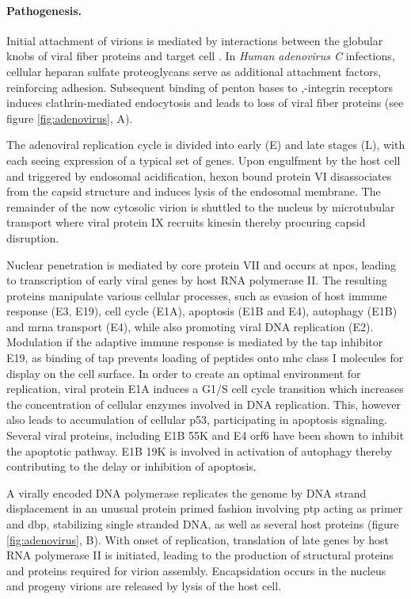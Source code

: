 \paragraph{Pathogenesis.}
Initial attachment of virions is mediated by interactions between the globular knobs of viral fiber proteins and target cell . In \textit{Human adenovirus C} infections, cellular heparan sulfate proteoglycans serve as additional attachment factors, reinforcing adhesion. Subsequent binding of penton bases to \textalpha,\textbeta-integrin receptors induces clathrin-mediated endocytosis and leads to loss of viral fiber proteins (see figure \ref{fig:adenovirus}, A).

The adenoviral replication cycle is divided into early (E) and late stages (L), with each seeing expression of a typical set of genes. Upon engulfment by the host cell and triggered by endosomal acidification, hexon bound protein VI disassociates from the capsid structure and induces lysis of the endosomal membrane. The remainder of the now cytosolic virion is shuttled to the nucleus by microtubular transport where viral protein IX recruits kinesin thereby procuring capsid disruption.

Nuclear penetration is mediated by core protein VII and occurs at \glspl{npc}, leading to transcription of early viral genes by host RNA polymerase II. The resulting proteins manipulate various cellular processes, such as evasion of host immune response (E3, E19), cell cycle (E1A), apoptosis (E1B and E4), autophagy (E1B) and \gls{mrna} transport (E4), while also promoting viral DNA replication (E2). Modulation if the adaptive immune response is mediated by the \gls{tap} inhibitor E19, as binding of \gls{tap} prevents loading of peptides onto \gls{mhc} class I molecules for display on the cell surface. In order to create an optimal environment for replication, viral protein E1A induces a G1\slash S cell cycle transition which increases the concentration of cellular enzymes involved in DNA replication. This, however also leads to accumulation of cellular p53, participating in apoptosis signaling. Several viral proteins, including E1B 55K and E4 orf6 have been shown to inhibit the apoptotic pathway. E1B 19K is involved in activation of autophagy thereby contributing to the delay or inhibition of apoptosis.

A virally encoded DNA polymerase replicates the genome by DNA strand displacement in an unusual protein primed fashion involving \gls{ptp} acting as primer and \gls{dbp}, stabilizing single stranded DNA, as well as several host proteins (figure \ref{fig:adenovirus}, B). With onset of replication, translation of late genes by host RNA polymerase II is initiated, leading to the production of structural proteins and proteins required for virion assembly. Encapsidation occurs in the nucleus and progeny virions are released by lysis of the host cell.

